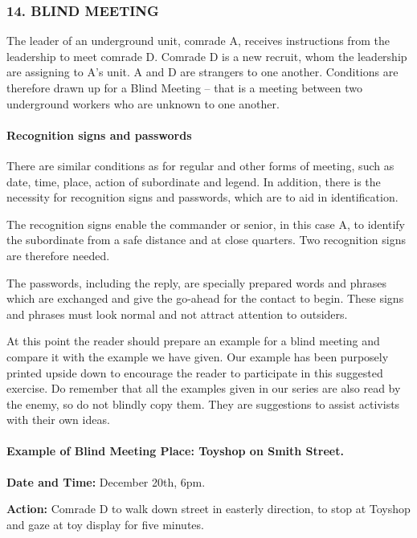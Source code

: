 \subsubsection{14. BLIND MEETING}

The leader of an underground unit, comrade A, receives instructions from
the leadership to meet comrade D. Comrade D is a new recruit, whom the
leadership are assigning to A's unit. A and D are strangers to one
another. Conditions are therefore drawn up for a Blind Meeting -- that
is a meeting between two underground workers who are unknown to one
another.

\paragraph{Recognition signs and passwords}

There are similar conditions as for regular and other forms of meeting,
such as date, time, place, action of subordinate and legend. In
addition, there is the necessity for recognition signs and passwords,
which are to aid in identification.

The recognition signs enable the commander or senior, in this case A, to
identify the subordinate from a safe distance and at close quarters. Two
recognition signs are therefore needed.

The passwords, including the reply, are specially prepared words and
phrases which are exchanged and give the go-ahead for the contact to
begin. These signs and phrases must look normal and not attract
attention to outsiders.

At this point the reader should prepare an example for a blind meeting
and compare it with the example we have given. Our example has been
purposely printed upside down to encourage the reader to participate in
this suggested exercise. Do remember that all the examples given in our
series are also read by the enemy, so do not blindly copy them. They are
suggestions to assist activists with their own ideas.

\paragraph{Example of Blind Meeting Place: Toyshop on Smith Street.}

\textbf{Date and Time:} December 20th, 6pm.

\textbf{Action:} Comrade D to walk down street in easterly direction, to
stop at Toyshop and gaze at toy display for five minutes.

